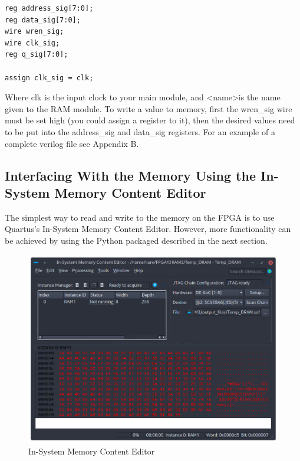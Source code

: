 \documentclass[letter,12pt]{article}
\begin{document}
\begin{verbatim}
reg address_sig[7:0];
reg data_sig[7:0];
wire wren_sig;
wire clk_sig;
reg q_sig[7:0];

assign clk_sig = clk;
\end{verbatim}

Where clk is the input clock to your main module, and \textless name\textgreater is the name given to the RAM module. To write a value to memory, first the wren\_sig wire must be set high (you could assign a register to it), then the desired values need to be put into the address\_sig and data\_sig registers. For an example of a complete verilog file see Appendix B.


\subsection{Interfacing With the Memory Using the In-System Memory Content Editor}

The simplest way to read and write to the memory on the FPGA is to use Quartus's In-System Memory Content Editor. However, more functionality can be achieved by using the Python packaged described in the next section.

\begin{figure}[H]
  \centering
  \includegraphics[width=\linewidth]{pics/MemoryEditor.png}
  \caption{In-System Memory Content Editor}
\end{figure}
\end{document}
